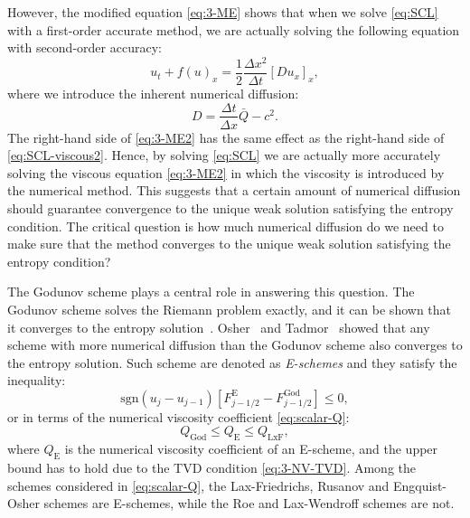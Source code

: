 However, the modified equation \eqref{eq:3-ME} shows that when we solve \eqref{eq:SCL} with a first-order accurate method, we are actually solving the following equation with second-order accuracy:
\begin{equation} \label{eq:3-ME2}
u_t + f(u)_x = \frac{1}{2} \frac{\Delta x^2}{\Delta t} \left[ D u_x \right]_x,
\end{equation}
where we introduce the inherent numerical diffusion:
\begin{equation} \label{eq:ME-D}
D = \frac{\Delta t}{\Delta x} \bar{Q} - c^2.
\end{equation}
The right-hand side of \eqref{eq:3-ME2} has the same effect as the right-hand side of \eqref{eq:SCL-viscous2}. Hence, by solving \eqref{eq:SCL} we are actually more accurately solving the viscous equation \eqref{eq:3-ME2} in which the viscosity is introduced by the numerical method.
This suggests that a certain amount of numerical diffusion should guarantee convergence to the unique weak solution satisfying the entropy condition. The critical question is how much numerical diffusion do we need to make sure that the method converges to the unique weak solution satisfying the entropy condition? 

The Godunov scheme plays a central role in answering this question. The Godunov scheme solves the Riemann problem exactly, and it can be shown that it converges to the entropy solution~\cite{osh84,tad84}. Osher~\cite{osh84} and Tadmor~\cite{tad84} showed that any scheme with more numerical diffusion than the Godunov scheme also converges to the entropy solution. Such scheme are denoted as \textit{E-schemes} and they satisfy the inequality:
\begin{equation}
\text{sgn} \left( u_j - u_{j-1} \right) \left[ F_{j-1/2}^\text{E} - F_{j-1/2}^\text{God} \right] \leq 0,
\end{equation}
or in terms of the numerical viscosity coefficient \eqref{eq:scalar-Q}:
\begin{equation}
Q_{\text{God}} \leq Q_{\text{E}} \leq Q_{\text{LxF}},
\end{equation}
where $ Q_\text{E} $ is the numerical viscosity coefficient of an E-scheme, and the upper bound has to hold due to the TVD condition \eqref{eq:3-NV-TVD}. Among the schemes considered in \eqref{eq:scalar-Q}, the Lax-Friedrichs, Rusanov and Engquist-Osher schemes are E-schemes, while the Roe and Lax-Wendroff schemes are not. 

